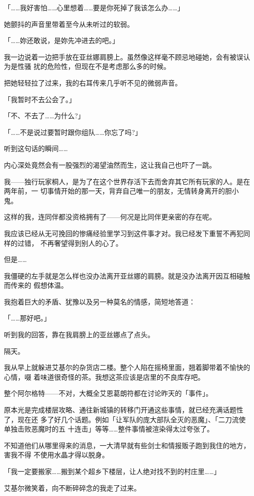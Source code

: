 \documentclass[11pt]{book}
\begin{document}
「……我好害怕……心里想着……要是你死掉了我该怎么办……」

她颤抖的声音里带着至今从未听过的软弱。

「……妳还敢说，是妳先冲进去的吧。」

我一边说着一边把手放在亚丝娜肩膀上。虽然像这样毫不顾忌地碰她，会有被误认为是性骚
扰的危险性，但现在不是考虑那么多的时候。

把她轻轻拉了过来，我的右耳传来几乎听不见的微弱声音。

「我暂时不去公会了。」

「不、不去了……为什么?」

「……不是说过要暂时跟你组队……你忘了吗?」

听到这句话的瞬间……

内心深处竟然会有一股强烈的渴望油然而生，这让我自己也吓了一跳。

我——独行玩家桐人，是为了在这个世界存活下去而舍弃其它所有玩家的人。是在两年前，一
切事情开始的那一天，背弃自己唯一的朋友，无情转身离开的胆小鬼。

这样的我，连同伴都没资格拥有了——何况是比同伴更亲密的存在呢。

我应该已经从无可挽回的惨痛经验里学习到这件事才对。我已经发下重誓不再犯同样的过错，
不再奢望得到别人的心了。

但是……

我僵硬的左手就是怎么样也没办法离开亚丝娜的肩膀。就是没办法离开因互相碰触而传来的
假想体温。

我抱着巨大的矛盾、犹豫以及另一种莫名的情感，简短地答道：

「……那好吧。」

听到我的回答，靠在我肩膀上的亚丝娜点了点头。

隔天。

我从早上就躲进艾基尔的杂货店二楼。整个人陷在摇椅里面，翘着脚带着不愉快的心情，啜
着味道很奇怪的茶。我想这茶应该是店里的不良库存吧。

整个阿尔格特——不对，大概全艾恩葛朗符都在讨论昨天的「事件」。

原本光是完成楼层攻略、通往新城镇的转移门开通这些事情，就已经充满话题性了，现在还
多了好几个话题。例如「让军队的庞大部队全灭的恶魔」、「二刀流使单独击败恶魔时的五
十连击」等等……整件事情被渲染得太过夸张了。

不知道他们从哪里得来的消息，一大清早就有些剑士和情报贩子跑到我住的地方，害我不得
不使用水晶才得以脱身。

「我一定要搬家……搬到某个超乡下楼层，让人绝对找不到的村庄里……」

艾基尔微笑着，向不断碎碎念的我走了过来。
\end{document}
